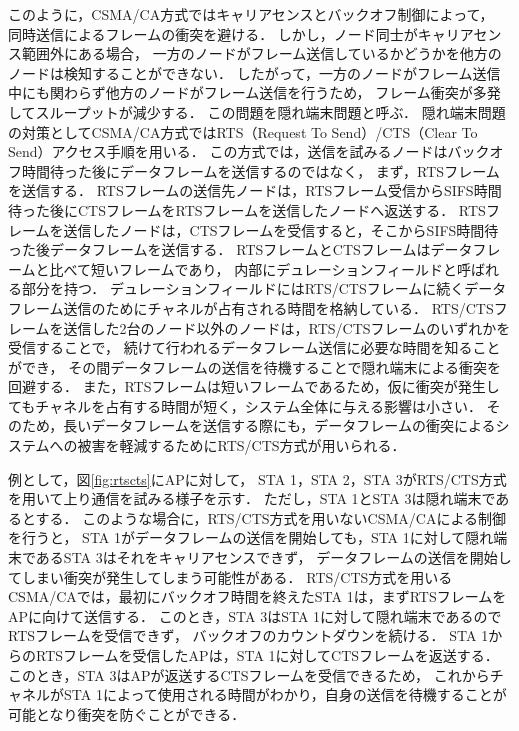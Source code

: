 \documentclass[master]{kuisthesis}		%
\begin{document}
			\par
			このように，CSMA/CA方式ではキャリアセンスとバックオフ制御によって，
			同時送信によるフレームの衝突を避ける．
			しかし，ノード同士がキャリアセンス範囲外にある場合，
			一方のノードがフレーム送信しているかどうかを他方のノードは検知することができない．
			したがって，一方のノードがフレーム送信中にも関わらず他方のノードがフレーム送信を行うため，
			フレーム衝突が多発してスループットが減少する．
			この問題を隠れ端末問題と呼ぶ．
			隠れ端末問題の対策としてCSMA/CA方式ではRTS（Request To Send）/CTS（Clear To Send）アクセス手順を用いる．
			この方式では，送信を試みるノードはバックオフ時間待った後にデータフレームを送信するのではなく，
			まず，RTSフレームを送信する．
			RTSフレームの送信先ノードは，RTSフレーム受信からSIFS時間待った後にCTSフレームをRTSフレームを送信したノードへ返送する．
			RTSフレームを送信したノードは，CTSフレームを受信すると，そこからSIFS時間待った後データフレームを送信する．
			RTSフレームとCTSフレームはデータフレームと比べて短いフレームであり，
			内部にデュレーションフィールドと呼ばれる部分を持つ．
			デュレーションフィールドにはRTS/CTSフレームに続くデータフレーム送信のためにチャネルが占有される時間を格納している．
			RTS/CTSフレームを送信した2台のノード以外のノードは，RTS/CTSフレームのいずれかを受信することで，
			続けて行われるデータフレーム送信に必要な時間を知ることができ，
			その間データフレームの送信を待機することで隠れ端末による衝突を回避する．
			また，RTSフレームは短いフレームであるため，仮に衝突が発生してもチャネルを占有する時間が短く，システム全体に与える影響は小さい．
			そのため，長いデータフレームを送信する際にも，データフレームの衝突によるシステムへの被害を軽減するためにRTS/CTS方式が用いられる．


			\par
			例として，図\ref{fig:rtscts}にAPに対して，
			STA 1，STA 2，STA 3がRTS/CTS方式を用いて上り通信を試みる様子を示す．
			ただし，STA 1とSTA 3は隠れ端末であるとする．
			このような場合に，RTS/CTS方式を用いないCSMA/CAによる制御を行うと，
			STA 1がデータフレームの送信を開始しても，STA 1に対して隠れ端末であるSTA 3はそれをキャリアセンスできず，
			データフレームの送信を開始してしまい衝突が発生してしまう可能性がある．
			RTS/CTS方式を用いるCSMA/CAでは，最初にバックオフ時間を終えたSTA 1は，まずRTSフレームをAPに向けて送信する．
			このとき，STA 3はSTA 1に対して隠れ端末であるのでRTSフレームを受信できず，
			バックオフのカウントダウンを続ける．
			STA 1からのRTSフレームを受信したAPは，STA 1に対してCTSフレームを返送する．
			このとき，STA 3はAPが返送するCTSフレームを受信できるため，
			これからチャネルがSTA 1によって使用される時間がわかり，自身の送信を待機することが可能となり衝突を防ぐことができる．
\end{document}
